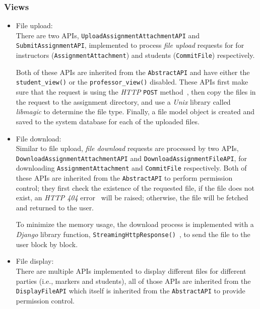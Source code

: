 \subsubsection{Views}
\begin{itemize}
    \item File upload: \\
    There are two APIs, 
    \texttt{Upload\-Assign\-ment\-Attach\-ment\-API} and
    \texttt{Sub\-mit\-Assign\-ment\-API}, 
    implemented to process \emph{file upload} requests for
    for instructors (\texttt{Assign\-ment\-Attach\-ment}) and students
    (\texttt{CommitFile}) respectively.

    Both of these APIs are inherited from the 
    \texttt{AbstractAPI} and have either the \texttt{student\_view()}
    or the \texttt{professor\_view()} disabled.
    These APIs first make sure that the request is using the
    \emph{HTTP} \texttt{POST} method~\citep[Section 4.3.3]{http},
    then copy the files in the request to the assignment directory, and use 
    a \emph{Unix} library called \emph{libmagic} \cite{libmagic} to determine
    the file type.
    Finally, a file model object is created and saved to the system database
    for each of the uploaded files.

    \item File download: \\
    Similar to file upload, \emph{file download} requests are processed by
    two APIs, \texttt{Down\-load\-Assign\-ment\-Attach\-ment\-API} and
    \texttt{Down\-load\-Assign\-ment\-File\-API},
    for downloading \texttt{AssignmentAttachment} and \texttt{CommitFile}
    respectively.
    Both
    of these APIs are inherited from the \texttt{AbstractAPI} to perform
    permission control; they
    first check the existence of the requested file, if the file
    does not exist, an \emph{HTTP 404} error~\citep[Section 6.5.4]{http} will be
    raised; otherwise, the
    file will be fetched and returned to the user.

    To minimize the memory usage, the download process is implemented with
    a \emph{Django} library function,
    \texttt{StreamingHttpResponse()}~\citep[Section Streaming\-Http\-Response
    objects]{djangoRequest},
    to send the file to the user block by block.

    \item File display: \\
    There are multiple APIs implemented to display different files for different
    parties
    (i.e., markers and students), all of those APIs are inherited from the
    \texttt{DisplayFileAPI} which itself is inherited from the
    \texttt{AbstractAPI} to provide permission control.


\end{itemize}
